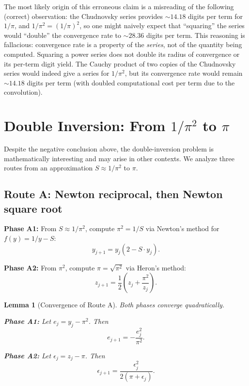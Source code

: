 \documentclass[11pt]{article}
\newtheorem{lemma}[theorem]{Lemma}
\begin{document}
The most likely origin of this erroneous claim is a misreading of the following (correct) observation: the Chudnovsky series provides ${\sim}14.18$ digits per term for $1/\pi$, and $1/\pi^2 = (1/\pi)^2$, so one might naively expect that ``squaring'' the series would ``double'' the convergence rate to ${\sim}28.36$ digits per term. This reasoning is fallacious: convergence rate is a property of the \emph{series}, not of the quantity being computed. Squaring a power series does not double its radius of convergence or its per-term digit yield. The Cauchy product of two copies of the Chudnovsky series would indeed give a series for $1/\pi^2$, but its convergence rate would remain ${\sim}14.18$ digits per term (with doubled computational cost per term due to the convolution).

\section{Double Inversion: From $1/\pi^2$ to $\pi$}
\label{sec:double-inversion}

Despite the negative conclusion above, the double-inversion problem is mathematically interesting and may arise in other contexts. We analyze three routes from an approximation $S \approx 1/\pi^2$ to $\pi$.

\subsection{Route A: Newton reciprocal, then Newton square root}

\noindent\textbf{Phase A1:} From $S \approx 1/\pi^2$, compute $\pi^2 = 1/S$ via Newton's method for $f(y) = 1/y - S$:
\begin{equation}\label{eq:newtonA1}
y_{j+1} = y_j(2 - S \cdot y_j).
\end{equation}

\noindent\textbf{Phase A2:} From $\pi^2$, compute $\pi = \sqrt{\pi^2}$ via Heron's method:
\begin{equation}\label{eq:newtonA2}
z_{j+1} = \frac{1}{2}\left(z_j + \frac{\pi^2}{z_j}\right).
\end{equation}

\begin{lemma}[Convergence of Route A]\label{lem:routeA}
Both phases converge quadratically.

\noindent\textbf{Phase A1:} Let $e_j = y_j - \pi^2$. Then
\begin{equation}\label{eq:A1-error}
e_{j+1} = -\frac{e_j^2}{\pi^2}.
\end{equation}

\noindent\textbf{Phase A2:} Let $\epsilon_j = z_j - \pi$. Then
\begin{equation}\label{eq:A2-error}
\epsilon_{j+1} = \frac{\epsilon_j^2}{2(\pi + \epsilon_j)}.
\end{equation}
\end{lemma}
\end{document}
